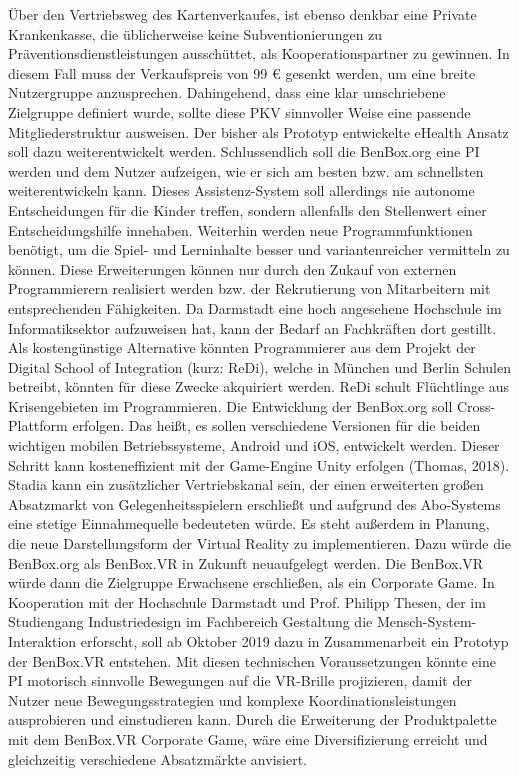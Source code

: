 \documentclass[
  a4paper,
  DIV=11,
  numbers=noendperiod,
  onecolumn,
  oneside,
  a4paper]{scrartcl}
\begin{document}
Über den Vertriebsweg des Kartenverkaufes, ist ebenso denkbar eine
Private Krankenkasse, die üblicherweise keine Subventionierungen zu
Präventionsdienstleistungen ausschüttet, als Kooperationspartner zu
gewinnen. In diesem Fall muss der Verkaufspreis von 99 € gesenkt werden,
um eine breite Nutzergruppe anzusprechen. Dahingehend, dass eine klar
umschriebene Zielgruppe definiert wurde, sollte diese PKV sinnvoller
Weise eine passende Mitgliederstruktur ausweisen. Der bisher als
Prototyp entwickelte eHealth Ansatz soll dazu weiterentwickelt werden.
Schlussendlich soll die BenBox.org eine PI werden und dem Nutzer
aufzeigen, wie er sich am besten bzw. am schnellsten weiterentwickeln
kann. Dieses Assistenz-System soll allerdings nie autonome
Entscheidungen für die Kinder treffen, sondern allenfalls den
Stellenwert einer Entscheidungshilfe innehaben. Weiterhin werden neue
Programmfunktionen benötigt, um die Spiel- und Lerninhalte besser und
variantenreicher vermitteln zu können. Diese Erweiterungen können nur
durch den Zukauf von externen Programmierern realisiert werden bzw. der
Rekrutierung von Mitarbeitern mit entsprechenden Fähigkeiten. Da
Darmstadt eine hoch angesehene Hochschule im Informatiksektor
aufzuweisen hat, kann der Bedarf an Fachkräften dort gestillt. Als
kostengünstige Alternative könnten Programmierer aus dem Projekt der
Digital School of Integration (kurz: ReDi), welche in München und Berlin
Schulen betreibt, könnten für diese Zwecke akquiriert werden. ReDi
schult Flüchtlinge aus Krisengebieten im Programmieren. Die Entwicklung
der BenBox.org soll Cross-Plattform erfolgen. Das heißt, es sollen
verschiedene Versionen für die beiden wichtigen mobilen Betriebssysteme,
Android und iOS, entwickelt werden. Dieser Schritt kann kosteneffizient
mit der Game-Engine Unity erfolgen (Thomas, 2018). Stadia kann ein
zusätzlicher Vertriebskanal sein, der einen erweiterten großen
Absatzmarkt von Gelegenheitsspielern erschließt und aufgrund des
Abo-Systems eine stetige Einnahmequelle bedeuteten würde. Es steht
außerdem in Planung, die neue Darstellungsform der Virtual Reality zu
implementieren. Dazu würde die BenBox.org als BenBox.VR in Zukunft
neuaufgelegt werden. Die BenBox.VR würde dann die Zielgruppe Erwachsene
erschließen, als ein Corporate Game. In Kooperation mit der Hochschule
Darmstadt und Prof. Philipp Thesen, der im Studiengang Industriedesign
im Fachbereich Gestaltung die Mensch-System-Interaktion erforscht, soll
ab Oktober 2019 dazu in Zusammenarbeit ein Prototyp der BenBox.VR
entstehen. Mit diesen technischen Voraussetzungen könnte eine PI
motorisch sinnvolle Bewegungen auf die VR-Brille projizieren, damit der
Nutzer neue Bewegungsstrategien und komplexe Koordinationsleistungen
ausprobieren und einstudieren kann. Durch die Erweiterung der
Produktpalette mit dem BenBox.VR Corporate Game, wäre eine
Diversifizierung erreicht und gleichzeitig verschiedene Absatzmärkte
anvisiert.
\end{document}
